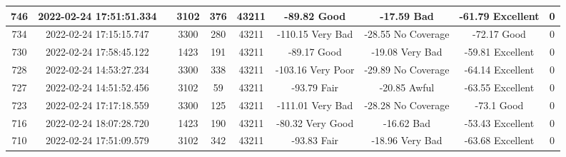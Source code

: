 \begin{longtable*}{|c|c|c|c|c|c|c|c|c|c|}
746&2022-02-24 17:51:51.334&&3102&376&43211& -89.82    Good        & -17.59    Bad         & -61.79    Excellent   & 0\\\hline
{}734&2022-02-24 17:15:15.747&&3300&280&43211& -110.15   Very Bad    & -28.55    No Coverage & -72.17    Good        & 0\\\hline
{}730&2022-02-24 17:58:45.122&&1423&191&43211& -89.17    Good        & -19.08    Very Bad    & -59.81    Excellent   & 0\\\hline
{}728&2022-02-24 14:53:27.234&&3300&338&43211& -103.16   Very Poor   & -29.89    No Coverage & -64.14    Excellent   & 0\\\hline
{}727&2022-02-24 14:51:52.456&&3102&59&43211& -93.79    Fair        & -20.85    Awful       & -63.55    Excellent   & 0\\\hline
{}723&2022-02-24 17:17:18.559&&3300&125&43211& -111.01   Very Bad    & -28.28    No Coverage & -73.1     Good        & 0\\\hline
{}716&2022-02-24 18:07:28.720&&1423&190&43211& -80.32    Very Good   & -16.62    Bad         & -53.43    Excellent   & 0\\\hline
{}710&2022-02-24 17:51:09.579&&3102&342&43211& -93.83    Fair        & -18.96    Very Bad    & -63.68    Excellent   & 0\\\hline

\end{longtable*}
